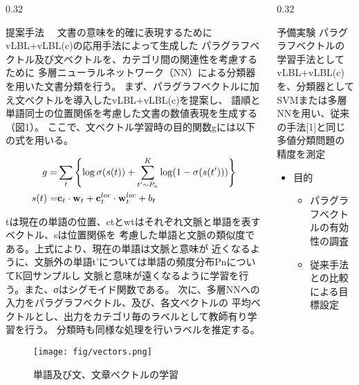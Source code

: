 \documentclass[10pt,unicode]{beamer}
\newcommand{\columnsize}{0.32}
\newcommand{\itemtitle}[1]{{\large #1} \\}
\begin{document}
\begin{frame}{}
\begin{columns}[t]
\begin{column}{\columnsize\textwidth} %
  \begin{block}{提案手法}
    　文書の意味を的確に表現するためにvLBL+vLBL(c)の応用手法によって生成した
    パラグラフベクトル及び文ベクトルを、カテゴリ間の関連性を考慮するために
    多層ニューラルネットワーク（NN）による分類器を用いた文書分類を行う。
    まず、パラグラフベクトルに加え文ベクトルを導入したvLBL+vLBL(c)を提案し、
    語順と単語同士の位置関係を考慮した文書の数値表現を生成する（図1）。
    ここで、文ベクトル学習時の目的関数gには以下の式を用いる。

    \begin{eqnarray*}
      g = & \sum_t \left\{ \log\sigma(s(t))
          + \sum^K_{t' \sim P_n} \log(1 - \sigma(s(t'))) \right\} \\
      s(t) = & {\bf c}_t \cdot {\bf w}_t
             + {\bf c}^{loc}_t \cdot {\bf w}^{loc}_t + b_t
    \end{eqnarray*}

    tは現在の単語の位置、ctとwtはそれぞれ文脈と単語を表すベクトル、sは位置関係を
    考慮した単語と文脈の類似度である。上式により、現在の単語は文脈と意味が
    近くなるように、文脈外の単語t'については単語の頻度分布PnについてK回サンプルし
    文脈と意味が遠くなるように学習を行う。また、σはシグモイド関数である。
    次に、多層NNへの入力をパラグラフベクトル、及び、各文ベクトルの
    平均ベクトルとし、出力をカテゴリ毎のラベルとして教師有り学習を行う。
    分類時も同様な処理を行いラベルを推定する。

    \begin{figure}
      \texttt{[image: fig/vectors.png]}
      \caption{単語及び文、文章ベクトルの学習}
    \end{figure}
  \end{block}
\end{column} %

\begin{column}{\columnsize\textwidth} %
  \begin{block}{予備実験}
    パラグラフベクトルの学習手法としてvLBL+vLBL(c)を、分類器として
    SVMまたは多層NNを用い、従来の手法[1]と同じ多値分類問題の精度を測定

    \begin{itemize}
      \item \itemtitle{目的}
      \begin{itemize}
        \item パラグラフベクトルの有効性の調査
        \item 従来手法との比較による目標設定
      \end{itemize}


\end{itemize}
\end{block}
\end{column}
\end{columns}
\end{frame}
\end{document}

